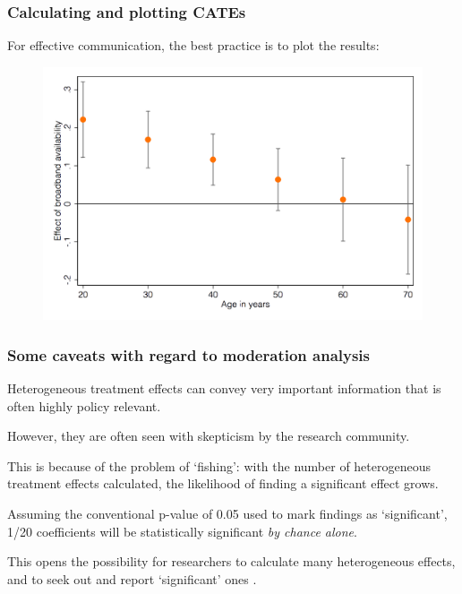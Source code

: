 \documentclass[12pt,english,dvipsnames,aspectratio=169,handout]{beamer}\usepackage[]{graphicx}\usepackage[]{xcolor}
\begin{document}
\begin{frame}
  \frametitle{Calculating and plotting CATEs}
\footnotesize

For effective communication, the best practice is to plot the results:

	 \begin{figure} 
    \includegraphics[height=.65\textheight,keepaspectratio=true]{../04-figures/10/06-w10_continuous}
    \end{figure}
    
\end{frame}



\begin{frame}
  \frametitle{Some caveats with regard to moderation analysis}
\footnotesize

Heterogeneous treatment effects can convey very important information that is often highly policy relevant. 

However, they are often seen with skepticism by the research community.

This is because of the problem of `fishing': with the number of heterogeneous treatment effects calculated, the likelihood of finding a significant effect grows.

Assuming the conventional p-value of 0.05 used to mark findings as `significant', 1/20 coefficients will be statistically significant \emph{by chance alone}. 

This opens the possibility for researchers to calculate many heterogeneous effects, and to seek out and report `significant' ones \cite{humphreys_fishing_2013}.

\end{frame}
\end{document}
